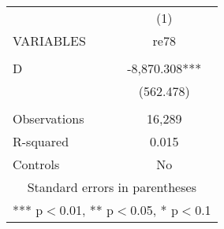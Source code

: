 \documentclass[]{article}
\begin{document}
\begin{tabular}{lc} \hline
 & (1) \\
VARIABLES & re78 \\ \hline
 &  \\
D & -8,870.308*** \\
 & (562.478) \\
 &  \\
Observations & 16,289 \\
R-squared & 0.015 \\
 Controls & No \\ \hline
\multicolumn{2}{c}{ Standard errors in parentheses} \\
\multicolumn{2}{c}{ *** p$<$0.01, ** p$<$0.05, * p$<$0.1} \\
\end{tabular}
\end{document}
